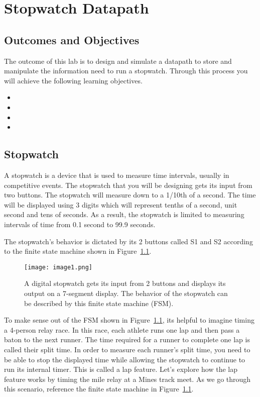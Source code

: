 \chapter{Stopwatch Datapath}
\label{chapter:stopDatapath}
\graphicspath{ {./Lab09Datapath/Fig} }



\section{Outcomes and Objectives}

The outcome of this lab is to design and simulate 
a datapath to store and manipulate the information need to run a stopwatch.
Through this process you will achieve the following
learning objectives.
\begin{itemize}
	\item {}
	\item {}
	\item {}
	\item {}
\end{itemize}



\section{Stopwatch}

A stopwatch is a device that is used to measure time intervals, usually
in competitive events. The stopwatch that you will be designing gets its
input from two buttons. The stopwatch will measure down to a 1/10th of a
second. The time will be displayed using 3 digits which will represent
tenths of a second, unit second and tens of seconds. As a result, the
stopwatch is limited to measuring intervals of time from 0.1 second to
99.9 seconds.

The stopwatch's behavior is dictated by its 2 buttons called S1 and S2
according to the finite state machine shown in Figure~\ref{fig:swDPbehavior}.

\begin{figure}[ht]
\texttt{[image: image1.png]}
\caption{A digital stopwatch gets its input from 2 buttons and displays
its output on a 7-segment display. The behavior of the stopwatch can be
described by this finite state machine (FSM).}
\label{fig:swDPbehavior}
\end{figure}

To make sense out of the FSM shown in Figure~\ref{fig:swDPbehavior}, its helpful to imagine
timing a 4-person relay race. In this race, each athlete runs one lap
and then pass a baton to the next runner. The time required for a runner
to complete one lap is called their split time. In order to measure each
runner's split time, you need to be able to stop the displayed time
while allowing the stopwatch to continue to run its internal timer. This
is called a lap feature. Let's explore how the lap feature works by
timing the mile relay at a Mines track meet. As we go through this
scenario, reference the finite state machine in Figure~\ref{fig:swDPbehavior}.

